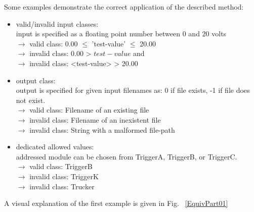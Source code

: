 	Some examples demonstrate the correct application of the described method:
	

	\begin{itemize}
		\item valid/invalid input classes: \\
			input is specified as a floating point number between 0 and 20 volts \\
			$\rightarrow$ valid class: 0.00 $\le$ 'test-value' $\le$ 20.00 \\
			$\rightarrow$ invalid class: 0.00 > $test-value$ and \\
			$\rightarrow$ invalid class: <test-value> > 20.00 \\
		\item output class: \\
			output is specified for given input filenames as: 0 if file exists, -1 if file does not exist. \\
			$\rightarrow$ valid class: Filename of an existing file\\
			$\rightarrow$ invalid class:  Filename of an inexistent file\\
			$\rightarrow$ invalid class:  String with a malformed file-path \\
		\item dedicated allowed values: \\
			addressed module can be chosen from TriggerA, TriggerB, or TriggerC. \\
			$\rightarrow$ valid class: TriggerB \\
			$\rightarrow$ invalid class:  TriggerK \\
			$\rightarrow$ invalid class:  Trucker \\
	\end{itemize}

	A visual explanation of the first example is given in Fig. ~\ref{EquivPart01}
	
